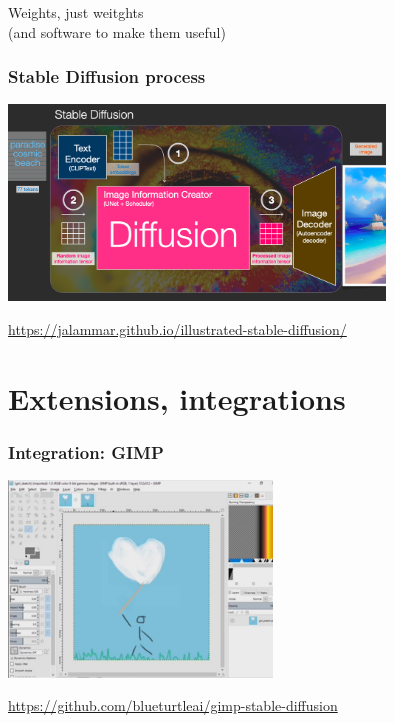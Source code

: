 \documentclass[17pt,aspectratio=169,hyperref={pdfusetitle,colorlinks,allcolors=olive}]{beamer}
\begin{document}
\begin{frame}[fragile]
Weights, just weitghts \\

(and software to make them useful)
\end{frame}



\begin{frame}[fragile]
  \frametitle{Stable Diffusion process}

      \includegraphics[width=10cm]{figs/sd-process}

  \begin{flushright}
    {\scriptsize
    \url{https://jalammar.github.io/illustrated-stable-diffusion/}
    }
  \end{flushright}

\end{frame}


\section{Extensions, integrations}

\begin{frame}[fragile]
  \frametitle{Integration: GIMP}

    \begin{center}
    \includegraphics[width=7cm]{figs/sd-gimp}
  \end{center}

  \begin{flushright}
    {\scriptsize
    \url{https://github.com/blueturtleai/gimp-stable-diffusion} \\
    }
  \end{flushright}
  
\end{frame}
\end{document}
